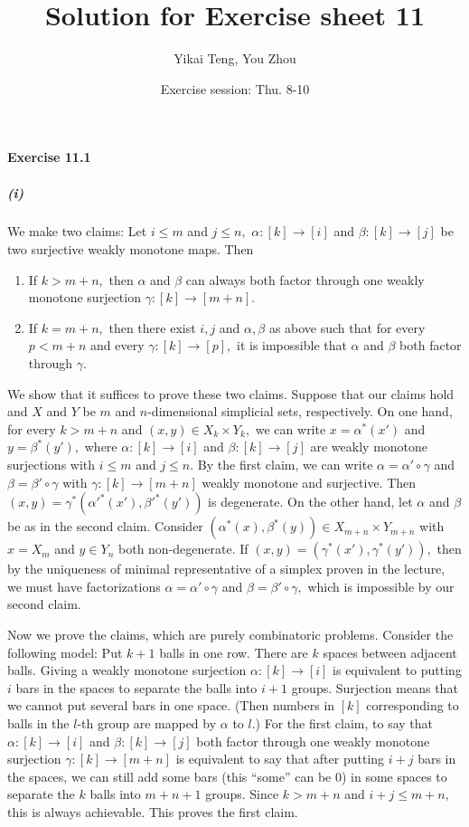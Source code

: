\documentclass{article}
\title{Solution for Exercise sheet 11}
\author{Yikai Teng, You Zhou}
\date{Exercise session: Thu. 8-10}
\begin{document}
\maketitle
\paragraph{Exercise 11.1}
\subparagraph{(i)}We make two claims: Let $i\leq m$ and $j\leq n,$ $\alpha\colon[k]\rightarrow[i]$ and $\beta\colon[k]\rightarrow[j]$ be two surjective weakly monotone maps. Then
\begin{enumerate}
  \item If $k>m+n,$ then $\alpha$ and $\beta$ can always both factor through one weakly monotone surjection $\gamma\colon[k]\rightarrow[m+n].$
  \item If $k=m+n,$ then there exist $i,j$ and $\alpha,\beta$ as above such that for every $p<m+n$ and every $\gamma\colon[k]\rightarrow[p],$ it is impossible that $\alpha$ and $\beta$ both factor through $\gamma.$
\end{enumerate}

We show that it suffices to prove these two claims. Suppose that our claims hold and $X$ and $Y$ be $m$ and $n$-dimensional simplicial sets, respectively. On one hand, for every $k>m+n$ and $(x,y)\in X_k\times Y_k,$ we can write $x=\alpha^*(x')$ and $y=\beta^*(y'),$ where $\alpha\colon[k]\rightarrow[i]$ and $\beta\colon[k]\rightarrow[j]$ are weakly monotone surjections with $i\leq m$ and $j\leq n.$ By the first claim, we can write $\alpha=\alpha'\circ\gamma$ and $\beta=\beta'\circ\gamma$ with $\gamma\colon[k]\rightarrow[m+n]$ weakly monotone and surjective. Then $(x,y)=\gamma^*(\alpha'^*(x'),\beta'^*(y'))$ is degenerate. On the other hand, let $\alpha$ and $\beta$ be as in the second claim. Consider $(\alpha^*(x),\beta^*(y))\in X_{m+n}\times Y_{m+n}$ with $x=X_m$ and $y\in Y_n$ both non-degenerate. If $(x,y)=(\gamma^*(x'),\gamma^*(y')),$ then by the uniqueness of minimal representative of a simplex proven in the lecture, we must have factorizations $\alpha=\alpha'\circ\gamma$ and $\beta=\beta'\circ\gamma,$ which is impossible by our second claim.

Now we prove the claims, which are purely combinatoric problems. Consider the following model: Put $k+1$ balls in one row. There are $k$ spaces between adjacent balls. Giving a weakly monotone surjection $\alpha\colon[k]\rightarrow[i]$ is equivalent to putting $i$ bars in the spaces to separate the balls into $i+1$ groups. Surjection means that we cannot put several bars in one space. (Then numbers in $[k]$ corresponding to balls in the $l$-th group are mapped by $\alpha$ to $l.$) For the first claim, to say that $\alpha\colon[k]\rightarrow[i]$ and $\beta\colon[k]\rightarrow[j]$ both factor through one weakly monotone surjection $\gamma\colon[k]\rightarrow[m+n]$ is equivalent to say that after putting $i+j$ bars in the spaces, we can still add some bars (this ``some'' can be 0) in some spaces to separate the $k$ balls into $m+n+1$ groups. Since $k>m+n$ and $i+j\leq m+n,$ this is always achievable. This proves the first claim.
\end{document}
